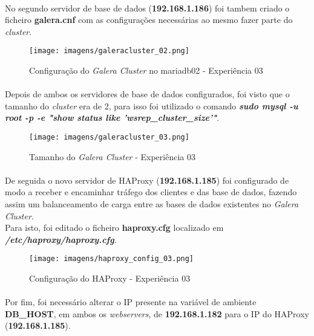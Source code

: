 \documentclass{report}
\begin{document}
\paragraph{}
No segundo servidor de base de dados (\textbf{192.168.1.186}) foi tambem criado o ficheiro \textbf{galera.cnf} com as configurações necessárias ao mesmo fazer parte do \emph{cluster}.

\begin{figure}[H]
\center
\texttt{[image: imagens/galeracluster\_02.png]}
\caption{Configuração do \emph{Galera Cluster} no mariadb02 - Experiência 03}
\label{fig.nav}
\end{figure}

\paragraph{}
Depois de ambos os servidores de base de dados configurados, foi visto que o tamanho do \emph{cluster} era de 2, para isso foi utilizado o comando \textbf{\emph{sudo mysql -u root -p -e "show status like 'wsrep\_cluster\_size'"}}.

\begin{figure}[H]
\center
\texttt{[image: imagens/galeracluster\_03.png]}
\caption{Tamanho do \emph{Galera Cluster} - Experiência 03}
\label{fig.nav}
\end{figure}

\paragraph{}
De seguida o novo servidor de HAProxy (\textbf{192.168.1.185}) foi configurado de modo a receber e encaminhar tráfego dos clientes e das base de dados, fazendo assim um balanceamento de carga entre as bases de dados existentes no \emph{Galera Cluster}.\\
Para isto, foi editado o ficheiro \textbf{haproxy.cfg} localizado em \textbf{\emph{/etc/haproxy/haproxy.cfg}}.

\begin{figure}[H]
\center
\texttt{[image: imagens/haproxy\_config\_03.png]}
\caption{Configuração do HAProxy - Experiência 03}
\label{fig.nav}
\end{figure}

\paragraph{}
Por fim, foi necessário alterar o IP presente na variável de ambiente \textbf{DB\_HOST}, em ambos os \emph{webservers}, de \textbf{192.168.1.182} para o IP do HAProxy (\textbf{192.168.1.185}).
\end{document}

